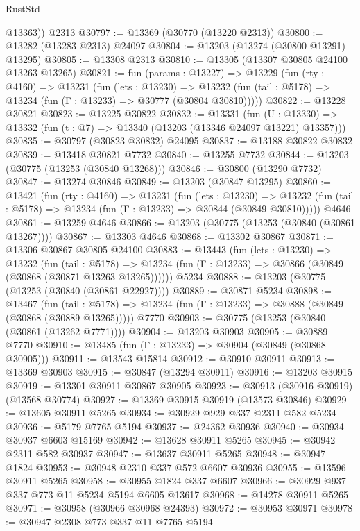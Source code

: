 \begin{lexlean}{RustStd}
\begin{coremodule}
        @13363))
    @2313
@30797 := @13369 (@30770 (@13220 @2313))
@30800 := @13282 (@13283 @2313) @24097
@30804 := @13203 (@13274 (@30800 @13291) @13295)
@30805 := @13308 @2313
@30810 := @13305 (@13307 @30805 @24100 @13263 @13265)
@30821 := fun (params : @13227) =>
  @13229
    (fun (rty : @4160) =>
    @13231
      (fun (lets : @13230) =>
      @13232 (fun (tail : @5178) => @13234 (fun (Γ : @13233) => @30777 (@30804 @30810)))))
@30822 := @13228 @30821
@30823 := @13225 @30822
@30832 := @13331
    (fun (U : @13330) => @13332 (fun (t : @7) => @13340 (@13203 (@13346 @24097 @13221) @13357)))
@30835 := @30797 (@30823 @30832) @24095
@30837 := @13188 @30822 @30832
@30839 := @13418 @30821 @7732
@30840 := @13255 @7732
@30844 := @13203 (@30775 (@13253 (@30840 @13268)))
@30846 := @30800 (@13290 @7732)
@30847 := @13274 @30846
@30849 := @13203 (@30847 @13295)
@30860 := @13421
    (fun (rty : @4160) =>
    @13231
      (fun (lets : @13230) =>
      @13232 (fun (tail : @5178) => @13234 (fun (Γ : @13233) => @30844 (@30849 @30810)))))
    @4646
@30861 := @13259 @4646
@30866 := @13203 (@30775 (@13253 (@30840 (@30861 @13267))))
@30867 := @13303 @4646
@30868 := @13302 @30867
@30871 := @13306 @30867 @30805 @24100
@30883 := @13443
    (fun (lets : @13230) =>
    @13232
      (fun (tail : @5178) =>
      @13234 (fun (Γ : @13233) => @30866 (@30849 (@30868 (@30871 @13263 @13265))))))
    @5234
@30888 := @13203 (@30775 (@13253 (@30840 (@30861 @22927))))
@30889 := @30871 @5234
@30898 := @13467
    (fun (tail : @5178) => @13234 (fun (Γ : @13233) => @30888 (@30849 (@30868 (@30889 @13265)))))
    @7770
@30903 := @30775 (@13253 (@30840 (@30861 (@13262 @7771))))
@30904 := @13203 @30903
@30905 := @30889 @7770
@30910 := @13485 (fun (Γ : @13233) => @30904 (@30849 (@30868 @30905)))
@30911 := @13543 @15814
@30912 := @30910 @30911
@30913 := @13369 @30903
@30915 := @30847 (@13294 @30911)
@30916 := @13203 @30915
@30919 := @13301 @30911 @30867 @30905
@30923 := @30913 (@30916 @30919) (@13568 @30774)
@30927 := @13369 @30915 @30919 (@13573 @30846)
@30929 := @13605 @30911 @5265
@30934 := @30929 @929 @337 @2311 @582 @5234
@30936 := @5179 @7765 @5194
@30937 := @24362 @30936
@30940 := @30934 @30937 @6603 @15169
@30942 := @13628 @30911 @5265
@30945 := @30942 @2311 @582 @30937
@30947 := @13637 @30911 @5265
@30948 := @30947 @1824
@30953 := @30948 @2310 @337 @572 @6607 @30936
@30955 := @13596 @30911 @5265
@30958 := @30955 @1824 @337 @6607
@30966 := @30929 @937 @337 @773 @11 @5234 @5194 @6605 @13617
@30968 := @14278 @30911 @5265
@30971 := @30958 (@30966 @30968 @24393)
@30972 := @30953 @30971
@30978 := @30947 @2308 @773 @337 @11 @7765 @5194

\end{coremodule}
\end{lexlean}
